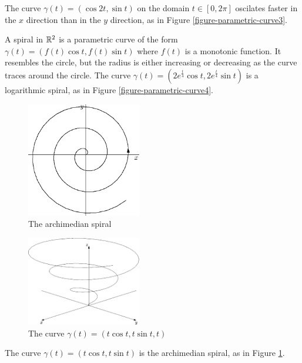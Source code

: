 \documentclass[fleqn,letterpaper]{report}
\begin{document}
\begin{example}
The curve $\gamma(t) = (\cos 2t, \sin t)$ on the domain
$t \in [0, 2\pi]$ oscilates faster in the $x$ direction than
in the $y$ direction, as in Figure \ref{figure-parametric-curve3}.
\end{example}

\begin{example}
A spiral in $\mathbb{R}^2$ is a parametric curve of the form
$\gamma(t) = (f(t) \cos t, f(t) \sin t)$ where $f(t)$ is a
monotonic function. It resembles the circle, but the radius is
either increasing or decreasing as the curve traces around the
circle. The curve $\gamma(t) = (2e^{\frac{t}{4}} \cos t,
2e^{\frac{t}{4}} \sin t)$ is a logarithmic spiral, as in
Figure \ref{figure-parametric-curve4}.
\end{example}

\begin{figure}[t]
\centering
\includegraphics[width=5cm]{figure14.eps}
\caption{The archimedian spiral}
\label{figure-parametric-curve5}
\end{figure}

\begin{figure}[t]
\centering
\includegraphics[width=5cm]{figure15.eps}
\caption{The curve $\gamma(t) = (t \cos t, t \sin t, t)$}
\label{figure-parametric-curve6}
\end{figure}

\begin{example}
The curve $\gamma(t) = (t \cos t, t \sin t)$ is the
archimedian spiral, as in Figure \ref{figure-parametric-curve5}.
\end{example}
\end{document}

